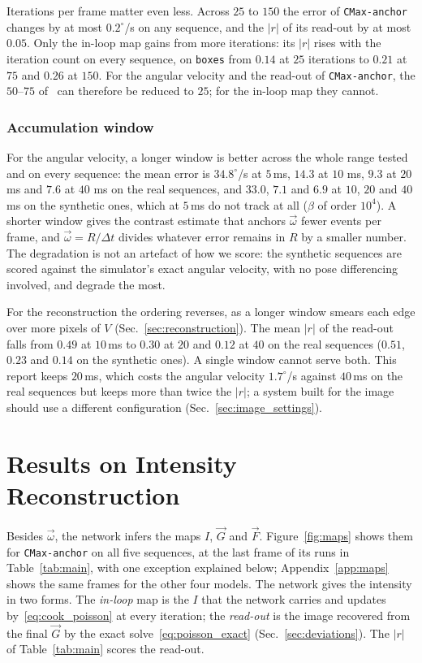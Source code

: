 \documentclass[journal]{IEEEtran}
\newcommand{\Imap}{I}
\newcommand{\Vmap}{V}
\newcommand{\Gmap}{\vec{G}}
\newcommand{\Fmap}{\vec{F}}
\newcommand{\wvec}{\vec{\omega}}
\begin{document}
Iterations per frame matter even less. Across $25$ to $150$ the error of \texttt{CMax-anchor} changes by at most $0.2^\circ$/s on any sequence, and the $|r|$ of its read-out by at most $0.05$. Only the in-loop map gains from more iterations: its $|r|$ rises with the iteration count on every sequence, on \texttt{boxes} from $0.14$ at $25$ iterations to $0.21$ at $75$ and $0.26$ at $150$. For the angular velocity and the read-out of \texttt{CMax-anchor}, the $50$--$75$ of~\cite{martel2019thesis} can therefore be reduced to $25$; for the in-loop map they cannot. 

\subsubsection{Accumulation window}
\label{sec:window_sweep}
For the angular velocity, a longer window is better across the whole range tested and on every sequence: the mean error is $34.8^\circ$/s at $5$\,ms, $14.3$ at $10$ ms, $9.3$ at $20$ ms and $7.6$ at $40$ ms on the real sequences, and $33.0$, $7.1$ and $6.9$ at $10$, $20$ and $40$\,ms on the synthetic ones, which at $5$\,ms do not track at all ($\beta$ of order $10^4$). A shorter window gives the contrast estimate that anchors $\wvec$ fewer events per frame, and $\wvec = R/\Delta t$ divides whatever error remains in $R$ by a smaller number. The degradation is not an artefact of how we score: the synthetic sequences are scored against the simulator's exact angular velocity, with no pose differencing involved, and degrade the most.

For the reconstruction the ordering reverses, as a longer window smears each edge over more pixels of $\Vmap$ (Sec.~\ref{sec:reconstruction}). The mean $|r|$ of the read-out falls from $0.49$ at $10$\,ms to $0.30$ at $20$ and $0.12$ at $40$ on the real sequences ($0.51$, $0.23$ and $0.14$ on the synthetic ones). A single window cannot serve both. This report keeps $20$\,ms, which costs the angular velocity $1.7^\circ$/s against $40$\,ms on the real sequences but keeps more than twice the $|r|$; a system built for the image should use a different configuration (Sec.~\ref{sec:image_settings}).

\section{Results on Intensity Reconstruction}
\label{sec:recon_experiments}
Besides $\wvec$, the network infers the maps $\Imap$, $\Gmap$ and $\Fmap$. Figure~\ref{fig:maps} shows them for \texttt{CMax-anchor} on all five sequences, at the last frame of its runs in Table~\ref{tab:main}, with one exception explained below; Appendix~\ref{app:maps} shows the same frames for the other four models. The network gives the intensity in two forms. The \emph{in-loop} map is the $\Imap$ that the network carries and updates by~\eqref{eq:cook_poisson} at every iteration; the \emph{read-out} is the image recovered from the final $\Gmap$ by the exact solve~\eqref{eq:poisson_exact} (Sec.~\ref{sec:deviations}). The $|r|$ of Table~\ref{tab:main} scores the read-out.
\end{document}
